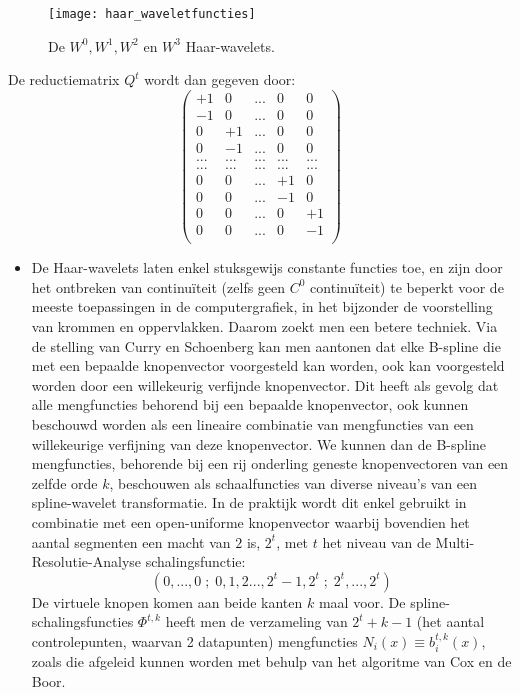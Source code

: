\documentclass{report}
\begin{document}
\begin{enumerate}
{		\begin{figure}[ht]
			\centering
			\texttt{[image: haar\_waveletfuncties]}
			\caption{De $W^0, W^1, W^2$ en $W^3$ Haar-wavelets.}
			\label{fig:haar_waveletfuncties}
		\end{figure}
		De reductiematrix $Q^t$ wordt dan gegeven door:
		$$
		\begin{pmatrix}
			+1 & 0 & ... & 0 & 0 \\
			-1 & 0 & ... & 0 & 0 \\
			0 & +1 &  ... & 0 & 0 \\
			0 & -1 &  ... & 0 & 0 \\
			... & ... & ... & ... & ... \\
			... & ... & ... & ... & ... \\
		 	0 & 0 & ... & +1 & 0  \\
		 	0 & 0 & ... & -1 & 0  \\
		 	0 & 0 & ... & 0 & +1  \\
		 	0 & 0 & ... & 0 & -1  \\
		\end{pmatrix}
		$$
	}
	
			
	{
		\begin{itemize} 
			\item De Haar-wavelets laten enkel stuksgewijs constante functies toe, en zijn door het ontbreken van continuïteit (zelfs geen $C^0$ continuïteit) te beperkt voor de meeste toepassingen in de computergrafiek, in het bijzonder de voorstelling van krommen en oppervlakken. Daarom zoekt men een betere techniek. Via de stelling van Curry en Schoenberg kan men aantonen dat elke B-spline die met een bepaalde knopenvector voorgesteld kan worden, ook kan voorgesteld worden door een willekeurig verfijnde knopenvector. Dit heeft als gevolg dat alle mengfuncties behorend bij een bepaalde knopenvector, ook kunnen beschouwd worden als een lineaire combinatie van mengfuncties van een willekeurige verfijning van deze knopenvector. We kunnen dan de B-spline mengfuncties, behorende bij een rij onderling geneste knopenvectoren van een zelfde orde $k$, beschouwen als schaalfuncties van diverse niveau's van een spline-wavelet transformatie. In de praktijk wordt dit enkel gebruikt in combinatie met een open-uniforme knopenvector waarbij bovendien het aantal segmenten een macht van $2$ is, $2^t$, met $t$ het niveau van de Multi-Resolutie-Analyse schalingsfunctie:
			$$(0, ...,0\;;\;0,1,2...,2^t-1,2^t\;;\;2^t,...,2^t)$$
			De virtuele knopen komen aan beide kanten $k$ maal voor. De spline-schalingsfuncties $\Phi^{t, k}$ heeft men de verzameling van $2^t + k - 1$ (het aantal controlepunten, waarvan 2 datapunten) mengfuncties $N_i(x) \equiv b_i^{t, k}(x)$, zoals die afgeleid kunnen worden met behulp van het algoritme van Cox en de Boor.
			

\end{itemize}}
\end{enumerate}
\end{document}
